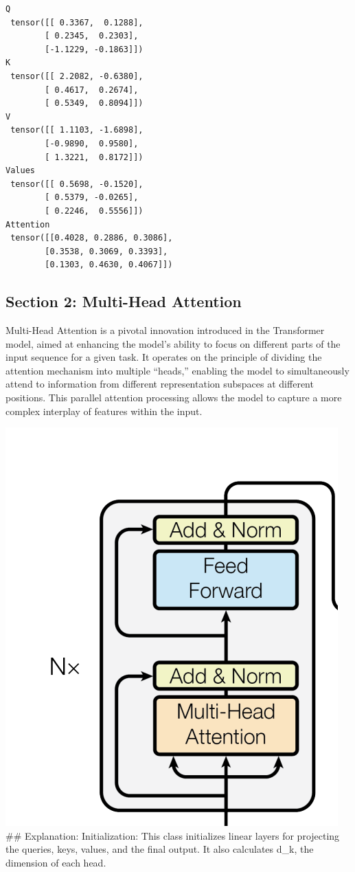 \documentclass[11pt]{article}
\begin{document}
    \begin{Verbatim}[commandchars=\\\{\}]
Q
 tensor([[ 0.3367,  0.1288],
        [ 0.2345,  0.2303],
        [-1.1229, -0.1863]])
K
 tensor([[ 2.2082, -0.6380],
        [ 0.4617,  0.2674],
        [ 0.5349,  0.8094]])
V
 tensor([[ 1.1103, -1.6898],
        [-0.9890,  0.9580],
        [ 1.3221,  0.8172]])
Values
 tensor([[ 0.5698, -0.1520],
        [ 0.5379, -0.0265],
        [ 0.2246,  0.5556]])
Attention
 tensor([[0.4028, 0.2886, 0.3086],
        [0.3538, 0.3069, 0.3393],
        [0.1303, 0.4630, 0.4067]])
    \end{Verbatim}

    \subsection{Section 2: Multi-Head
Attention}\label{section-2-multi-head-attention}

    Multi-Head Attention is a pivotal innovation introduced in the
Transformer model, aimed at enhancing the model's ability to focus on
different parts of the input sequence for a given task. It operates on
the principle of dividing the attention mechanism into multiple
``heads,'' enabling the model to simultaneously attend to information
from different representation subspaces at different positions. This
parallel attention processing allows the model to capture a more complex
interplay of features within the input.

\includegraphics{image.png} \#\# Explanation: Initialization: This class
initializes linear layers for projecting the queries, keys, values, and
the final output. It also calculates d\_k, the dimension of each head.
\end{document}
